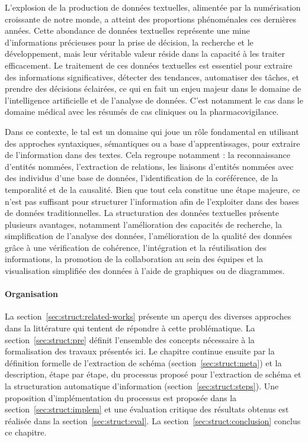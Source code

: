 L'explosion de la production de données textuelles, alimentée par la numérisation croissante de notre monde, a atteint des proportions phénoménales ces dernières années.
Cette abondance de données textuelles représente une mine d'informations précieuses pour la prise de décision, la recherche et le développement, mais leur véritable valeur réside dans la capacité à les traiter efficacement.
Le traitement de ces données textuelles est essentiel pour extraire des informations significatives, détecter des tendances, automatiser des tâches, et prendre des décisions éclairées, ce qui en fait un enjeu majeur dans le domaine de l'intelligence artificielle et de l'analyse de données.
C'est notamment le cas dans le domaine médical avec les résumés de cas cliniques ou la pharmacovigilance.

Dans ce contexte, le \gls{tal} est un domaine qui joue un rôle fondamental en utilisant des approches syntaxiques, sémantiques ou a base d'apprentissages, pour extraire de l'information dans des textes.
Cela regroupe notamment : la reconnaissance d'entités nommées, l'extraction de relations, les liaisons d'entités nommées avec des individus d'une base de données, l'identification de la coréférence, de la temporalité et de la causalité.
Bien que tout cela constitue une étape majeure, ce n'est pas suffisant pour structurer l'information afin de l'exploiter dans des bases de données traditionnelles.
La structuration des données textuelles présente plusieurs avantages, notamment l'amélioration des capacités de recherche, la simplification de l'analyse des données, l'amélioration de la qualité des données grâce à une vérification de cohérence, l'intégration et la réutilisation des informations, la promotion de la collaboration au sein des équipes et la visualisation simplifiée des données à l'aide de graphiques ou de diagrammes.

\paragraph{Organisation}
La section~\ref{sec:struct:related-works} présente un aperçu des diverses approches dans la littérature qui tentent de répondre à cette problématique.
La section~\ref{sec:struct:pre} définit l'ensemble des concepts nécessaire à la formalisation des travaux présentés ici.
Le chapitre continue ensuite par la définition formelle de l'extraction de schéma (section~\ref{sec:struct:meta}) et la description, étape par étape, du processus proposé pour l'extraction de schéma et la structuration automatique d'information (section~\ref{sec:struct:steps}).
Une proposition d'implémentation du processus est proposée dans la section~\ref{sec:struct:implem} et une évaluation critique des résultats obtenus est réalisée dans la section~\ref{sec:struct:eval}.
La section~\ref{sec:struct:conclusion} conclus ce chapitre.

